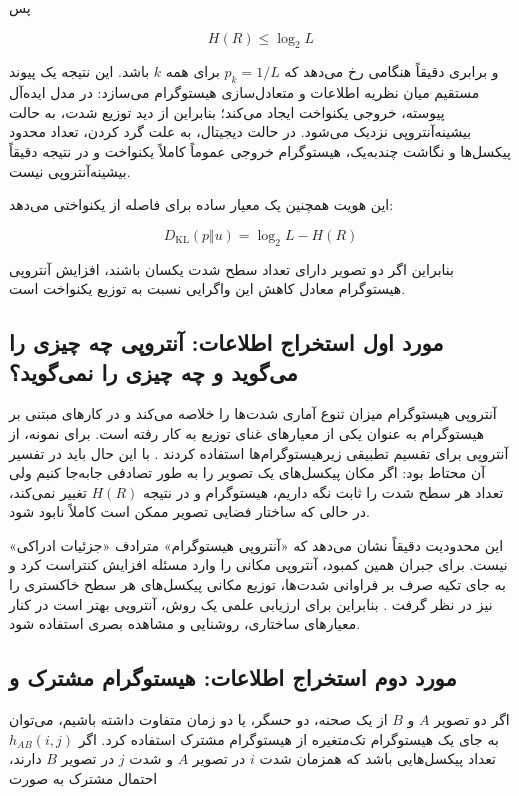 \documentclass[12pt,a4paper]{article}
\begin{document}
پس

\[
 \boxed{H(R)\le \log_2 L}
\]

و برابری دقیقاً هنگامی رخ می‌دهد که $p_k=1/L$ برای همه $k$ باشد. این نتیجه یک پیوند
مستقیم میان نظریه اطلاعات و متعادل‌سازی هیستوگرام می‌سازد: در مدل ایده‌آل پیوسته،
 خروجی یکنواخت ایجاد می‌کند؛ بنابراین از دید توزیع شدت،
به حالت بیشینه‌آنتروپی نزدیک می‌شود. در حالت دیجیتال، به علت گرد کردن، تعداد محدود
پیکسل‌ها و نگاشت چندبه‌یک، هیستوگرام خروجی عموماً کاملاً یکنواخت و در نتیجه دقیقاً
بیشینه‌آنتروپی نیست.

این هویت همچنین یک معیار ساده برای فاصله از یکنواختی می‌دهد:

\[
 \boxed{
 D_{\mathrm{KL}}(p\Vert u)=\log_2L-H(R)
 }
\]

بنابراین اگر دو تصویر دارای تعداد سطح شدت یکسان باشند، افزایش آنتروپی هیستوگرام
معادل کاهش این واگرایی نسبت به توزیع یکنواخت است.

\subsection{مورد اول استخراج اطلاعات: آنتروپی چه چیزی را می‌گوید و چه چیزی را نمی‌گوید؟}

آنتروپی هیستوگرام میزان تنوع آماری شدت‌ها را خلاصه می‌کند و در کارهای مبتنی بر
هیستوگرام به عنوان یکی از معیارهای غنای توزیع به کار رفته است. برای نمونه،
 از آنتروپی برای تقسیم تطبیقی زیرهیستوگرام‌ها استفاده کردند
\cite{zhuang2018}. با این حال باید در تفسیر آن محتاط بود: اگر مکان پیکسل‌های یک تصویر
را به طور تصادفی جابه‌جا کنیم ولی تعداد هر سطح شدت را ثابت نگه داریم، هیستوگرام و
در نتیجه $H(R)$ تغییر نمی‌کند، در حالی که ساختار فضایی تصویر ممکن است کاملاً نابود
شود.

این محدودیت دقیقاً نشان می‌دهد که «آنتروپی هیستوگرام» مترادف «جزئیات ادراکی» نیست.
 برای جبران همین کمبود، آنتروپی مکانی را وارد مسئله افزایش کنتراست کرد و
به جای تکیه صرف بر فراوانی شدت‌ها، توزیع مکانی پیکسل‌های هر سطح خاکستری را نیز در
نظر گرفت \cite{celik2014}. بنابراین برای ارزیابی علمی یک روش، آنتروپی بهتر است در کنار
معیارهای ساختاری، روشنایی و مشاهده بصری استفاده شود.

\subsection{مورد دوم استخراج اطلاعات: هیستوگرام مشترک و }

اگر دو تصویر $A$ و $B$ از یک صحنه، دو حسگر، یا دو زمان متفاوت داشته باشیم، می‌توان
به جای یک هیستوگرام تک‌متغیره از هیستوگرام مشترک استفاده کرد. اگر
$h_{AB}(i,j)$ تعداد پیکسل‌هایی باشد که همزمان شدت $i$ در تصویر $A$ و شدت $j$ در تصویر
$B$ دارند، احتمال مشترک به صورت
\end{document}

